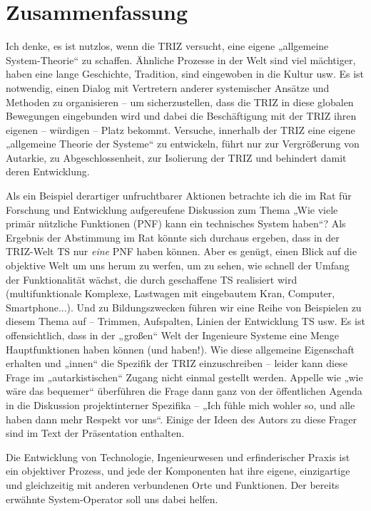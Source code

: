 \documentclass[11pt,a4paper]{article}
\begin{document}
\section{Zusammenfassung}
Ich denke, es ist nutzlos, wenn die TRIZ versucht, eine eigene „allgemeine
System-Theorie“ zu schaffen.  Ähnliche Prozesse in der Welt sind viel
mächtiger, haben eine lange Geschichte, Tradition, sind eingewoben in die
Kultur usw. Es ist notwendig, einen Dialog mit Vertretern anderer systemischer
Ansätze und Methoden zu organisieren -- um sicherzustellen, dass die TRIZ in
diese globalen Bewegungen eingebunden wird und dabei die Beschäftigung mit der
TRIZ ihren eigenen -- würdigen -- Platz bekommt. Versuche, innerhalb der TRIZ
eine eigene „allgemeine Theorie der Systeme“ zu entwickeln, führt nur zur
Vergrößerung von Autarkie, zu Abgeschlossenheit, zur Isolierung der TRIZ und
behindert damit deren Entwicklung.

Als ein Beispiel derartiger unfruchtbarer Aktionen betrachte ich die im Rat
für Forschung und Entwicklung aufgereufene Diskussion zum Thema „Wie viele
primär nützliche Funktionen (PNF) kann ein technisches System haben“? Als
Ergebnis der Abstimmung im Rat könnte sich durchaus ergeben, dass in der
TRIZ-Welt TS nur \emph{eine} PNF haben können. Aber es genügt, einen Blick auf
die objektive Welt um uns herum zu werfen, um zu sehen, wie schnell der Umfang
der Funktionalität wächst, die durch geschaffene TS realisiert wird
(multifunktionale Komplexe, Lastwagen mit eingebautem Kran, Computer,
Smartphone...).  Und zu Bildungszwecken führen wir eine Reihe von Beispielen
zu diesem Thema auf -- Trimmen, Aufspalten, Linien der Entwicklung TS usw.  Es
ist offensichtlich, dass in der „großen“ Welt der Ingenieure Systeme eine
Menge Hauptfunktionen haben können (und haben!). Wie diese allgemeine
Eigenschaft erhalten und „innen“ die Spezifik der TRIZ einzuschreiben --
leider kann diese Frage im „autarkistischen“ Zugang nicht einmal gestellt
werden. Appelle wie „wie wäre das bequemer“ überführen die Frage dann ganz von
der öffentlichen Agenda in die Diskussion projektinterner Spezifika -- „Ich
fühle mich wohler so, und alle haben dann mehr Respekt vor uns“. Einige der
Ideen des Autors zu diese Frager sind im Text der Präsentation enthalten.

Die Entwicklung von Technologie, Ingenieurwesen und erfinderischer Praxis ist
ein objektiver Prozess, und jede der Komponenten hat ihre eigene, einzigartige
und gleichzeitig mit anderen verbundenen Orte und Funktionen. Der bereits
erwähnte System-Operator soll uns dabei helfen.
\end{document}

